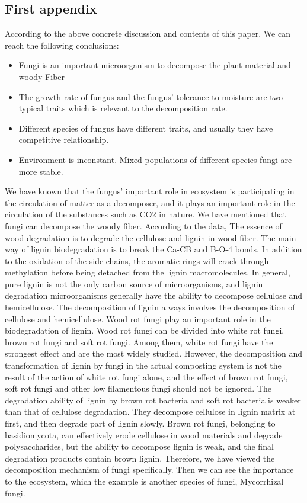 \documentclass{mcmthesis}
\begin{document}
\begin{appendices}

\section{First appendix}
According to the above concrete discussion and contents of this paper. We can reach the following conclusions: 
\begin{itemize}
  \item Fungi is an important microorganism to decompose the plant material and woody Fiber
  \item The growth rate of fungus and the fungus’ tolerance to moisture are two typical traits which is relevant to the decomposition rate.
  \item Different species of fungus have different traits, and usually they have competitive relationship.
  \item Environment is inconstant. Mixed populations of different species fungi are more stable.
\end{itemize}

We have known that the fungus’ important role in ecosystem is participating in the circulation of matter as a decomposer, and it plays an important role in the circulation of the substances such as CO2 in nature. 
We have mentioned that fungi can decompose the woody fiber. 
According to the data, The essence of wood degradation is to degrade the cellulose and lignin in wood fiber. 
The main way of lignin biodegradation is to break the Ca-CB and B-O-4 bonds. 
In addition to the oxidation of the side chains, the aromatic rings will crack through methylation before being detached from the lignin macromolecules. 
In general, pure lignin is not the only carbon source of microorganisms, and lignin degradation microorganisms generally have the ability to decompose cellulose and hemicellulose. 
The decomposition of lignin always involves the decomposition of cellulose and hemicellulose.
Wood rot fungi play an important role in the biodegradation of lignin. Wood rot fungi can be divided into white rot fungi, brown rot fungi and soft rot fungi. 
Among them, white rot fungi have the strongest effect and are the most widely studied.
However, the decomposition and transformation of lignin by fungi in the actual composting system is not the result of the action of white rot fungi alone, and the effect of brown rot fungi, soft rot fungi and other low filamentous fungi should not be ignored. 
The degradation ability of lignin by brown rot bacteria and soft rot bacteria is weaker than that of cellulose degradation. 
They decompose cellulose in lignin matrix at first, and then degrade part of lignin slowly. 
Brown rot fungi, belonging to basidiomycota, can effectively erode cellulose in wood materials and degrade polysaccharides, but the ability to decompose lignin is weak, and the final degradation products contain brown lignin. 
Therefore, we have viewed the decomposition mechanism of fungi specifically. 
Then we can see the importance to the ecosystem, which the example is another species of fungi, Mycorrhizal fungi.


\end{appendices}
\end{document}
